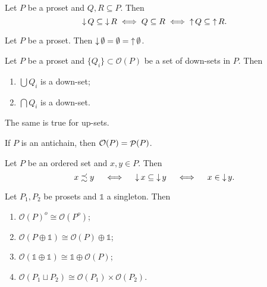 \begin{lemma}
Let $P$ be a proset and $Q,R\subseteq P$. Then
\[ \mathop{\downarrow} Q \subseteq \mathop{\downarrow} R \iff Q \subseteq R \iff \mathop{\uparrow} Q \subseteq \mathop{\uparrow} R. \]
\end{lemma}

\begin{lemma}
Let $P$ be a proset. Then $\mathop{\downarrow}\emptyset = \emptyset = \mathop{\uparrow}\emptyset$.
\end{lemma}

\begin{lemma}
Let $P$ be a proset and $\{Q_i\}\subset \mathcal{O}(P)$ be a set of down-sets in $P$. Then
\begin{enumerate}
\item $\bigcup Q_i$ is a down-set;
\item $\bigcap Q_i$ is a down-set.
\end{enumerate}
The same is true for up-sets.
\end{lemma}

If $P$ is an antichain, then $\mathcal{O}(P) = \mathop{\mathcal{P}}(P)$.

\begin{lemma}
Let $P$ be an ordered set and $x, y \in P$. Then
\[ x\precsim y \quad\iff\quad \mathop{\downarrow} x \subseteq \mathop{\downarrow} y \quad\iff\quad x\in \mathop{\downarrow} y. \]
\end{lemma}

\begin{lemma}
Let $P_1,P_2$ be prosets and $\mathbb{1}$ a singleton. Then
\begin{enumerate}
\item $\mathcal{O}(P)^o \cong \mathcal{O}(P^o)$;
\item $\mathcal{O}(P\oplus \mathbb{1}) \cong \mathcal{O}(P)\oplus \mathbb{1}$;
\item $\mathcal{O}(\mathbb{1}\oplus \mathbb{1}) \cong \mathbb{1}\oplus \mathcal{O}(P)$;
\item $\mathcal{O}(P_1\sqcup P_2)\cong \mathcal{O}(P_1)\times \mathcal{O}(P_2)$.
\end{enumerate}
\end{lemma}

